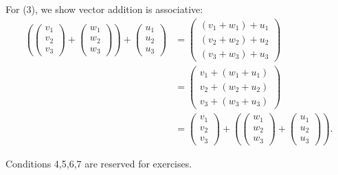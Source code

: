 \begin{example}{}
For (3), we show vector addition is associative:
\begin{align*}
\left( \left(\begin{array}{c}v_1\\v_2\\v_3\end{array}\right) + \left(\begin{array}{c}w_1\\w_2\\w_3\end{array}\right) \right) + \left(\begin{array}{c}u_1\\u_2\\u_3\end{array}\right) &= \left(\begin{array}{c}(v_1+w_1)+u_1\\(v_2+w_2)+u_2\\(v_3+w_3)+u_3\end{array}\right) \\
&= \left(\begin{array}{c}v_1+(w_1+u_1)\\v_2+(w_2+u_2)\\v_3+(w_3+u_3)\end{array}\right) \\
& =  \left(\begin{array}{c}v_1\\v_2\\v_3\end{array}\right) + \left( \left(\begin{array}{c}w_1\\w_2\\w_3\end{array}\right)   + \left(\begin{array}{c}u_1\\u_2\\u_3\end{array}\right) \right).
\end{align*}
\end{example}

Conditions 4,5,6,7 are reserved for exercises.


